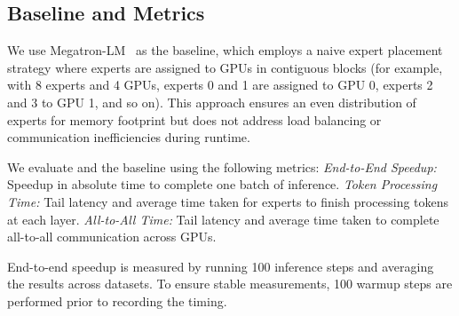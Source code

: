 \begin{table}
    \centering
    \caption{H200 Server Node Specifications}
    \vspace{-0.7em}
    \label{tab:hardware-specs1}
\end{table}
\vspace{-1em}

\subsection{Baseline and Metrics}

We use Megatron-LM~\cite{megatron} as the baseline, which employs a naive expert placement strategy where experts are assigned to GPUs in contiguous blocks (for example, with 8 experts and 4 GPUs, experts 0 and 1 are assigned to GPU 0, experts 2 and 3 to GPU 1, and so on). 
%
This approach ensures an even distribution of experts for memory footprint but does not address load balancing or communication inefficiencies during runtime. 
%

%
We evaluate \expertune and the baseline using the following metrics: \textit{End-to-End Speedup:} Speedup in absolute time to complete one batch of inference. \textit{Token Processing Time:} Tail latency and average time taken for experts to finish processing tokens at each layer. \textit{All-to-All Time:} Tail latency and average time taken to complete all-to-all communication across GPUs.

End-to-end speedup is measured by running 100 inference steps and averaging the results across datasets. To ensure stable measurements, 100 warmup steps are performed prior to recording the timing.

